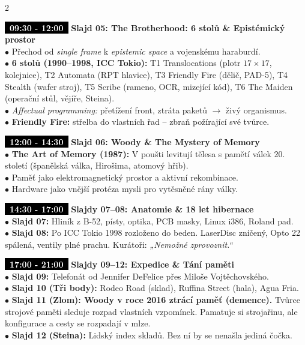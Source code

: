 \documentclass[a4paper,9.5pt]{article}
\newcommand{\badge}[1]{\textbf{\colorbox{black}{\textcolor{white}{\footnotesize~#1~}}}}
\begin{document}
\begin{multicols}{2}
\begin{tcolorbox}
\badge{09:30 - 12:00} \textbf{Slajd 05: The Brotherhood: 6 stolů \& Epistémický prostor}\\
$\bullet$ Přechod od \textit{single frame} k \textit{epistemic space} a vojenskému haraburdí.\\
$\bullet$ \textbf{6 stolů (1990--1998, ICC Tokio):} T1 Translocations (plotr $17\times 17$, kolejnice), T2 Automata (RPT hlavice), T3 Friendly Fire (dělič, PAD-5), T4 Stealth (wafer stroj), T5 Scribe (rameno, OCR, mizející kód), T6 The Maiden (operační stůl, vějíře, Steina).\\
$\bullet$ \textit{Affectual programming:} přetížení front, ztráta paketů $\rightarrow$ živý organismus.\\
$\bullet$ \textbf{Friendly Fire:} střelba do vlastních řad – zbraň požírající své tvůrce.
\end{tcolorbox}

\begin{tcolorbox}
\badge{12:00 - 14:30} \textbf{Slajd 06: Woody \& The Mystery of Memory}\\
$\bullet$ \textbf{The Art of Memory (1987):} V poušti levitují tělesa s pamětí válek 20. století (španělská válka, Hirošima, atomový hřib).\\
$\bullet$ Paměť jako elektromagnetický prostor a aktivní rekombinace.\\
$\bullet$ Hardware jako vnější protéza mysli pro vytěsněné rány války.
\end{tcolorbox}

\begin{tcolorbox}
\badge{14:30 - 17:00} \textbf{Slajdy 07--08: Anatomie \& 18 let hibernace}\\
$\bullet$ \textbf{Slajd 07:} Hliník z B-52, písty, optika, PCB masky, Linux i386, Roland pad.\\
$\bullet$ \textbf{Slajd 08:} Po ICC Tokio 1998 rozloženo do beden. LaserDisc zničený, Opto 22 spálená, ventily plné prachu. Kurátoři: \textit{„Nemožné zprovoznit.“}
\end{tcolorbox}

\begin{tcolorbox}
\badge{17:00 - 21:00} \textbf{Slajdy 09--12: Expedice \& Tání paměti}\\
$\bullet$ \textbf{Slajd 09:} Telefonát od Jennifer DeFelice přes Miloše Vojtěchovského.\\
$\bullet$ \textbf{Slajd 10 (Tři body):} Rodeo Road (sklad), Ruffina Street (hala), Agua Fria.\\
$\bullet$ \textbf{Slajd 11 (Zlom): Woody v roce 2016 ztrácí paměť (demence).} Tvůrce strojové paměti sleduje rozpad vlastních vzpomínek. Pamatuje si strojařinu, ale konfigurace a cesty se rozpadají v mlze.\\
$\bullet$ \textbf{Slajd 12 (Steina):} Lidský index skladů. Bez ní by se nenašla jediná čočka.
\end{tcolorbox}


\end{multicols}
\end{document}

